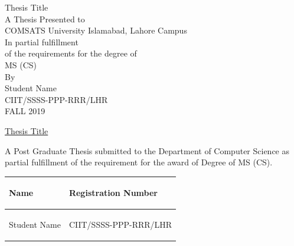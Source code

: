 \begin{titlepage}
\begin{center}
\vspace{1.0cm } 
\LARGE Thesis Title \\
\vspace{1.0cm } 
\Large A Thesis Presented to \\ 
\vspace{1.0cm }
\Large COMSATS University Islamabad, Lahore Campus  \\ 
\vspace{1.2cm }
\Large In partial fulfillment  \\
\vspace{0.7cm }
\Large of the requirements for the degree of  \\  
\vspace{1.2cm }
\LARGE MS (CS)  \\  
\vspace{0.9cm }
\Large By  \\  
\vspace{0.6cm }
\Large Student Name  \\  
\vspace{0.6cm }
\Large CIIT/SSSS-PPP-RRR/LHR  \\  
\vspace{0.6cm }
\Large FALL 2019  \\  
\vspace{5in}
\pagebreak


\LARGE \underline{Thesis Title}  
\end{center}
\vspace{0.6cm } 
\normalsize A Post Graduate Thesis submitted to the Department of Computer Science as partial fulfillment of the requirement for the award of Degree of MS (CS). \\  

\begin{center}
	\begin{table}[h!]
		\begin{center}
			\label{tab:student_info}
			\renewcommand{\arraystretch}{1}%
			\setlength{\arrayrulewidth}{1pt}%
			
			\begin{tabular}{|p{6.3cm}|p{6.3cm}|}
				\hline
				\rowcolor{lightgray}
				\begin{center} \large Name \end{center} & \begin{center}  \large Registration Number\end{center} \\
				\hline
				\begin{center}\large Student Name \end{center} & \begin{center}\large CIIT/SSSS-PPP-RRR/LHR \end{center}\\
				\hline
			\end{tabular}
		\end{center}
	\end{table}
\end{center}


\end{titlepage}
